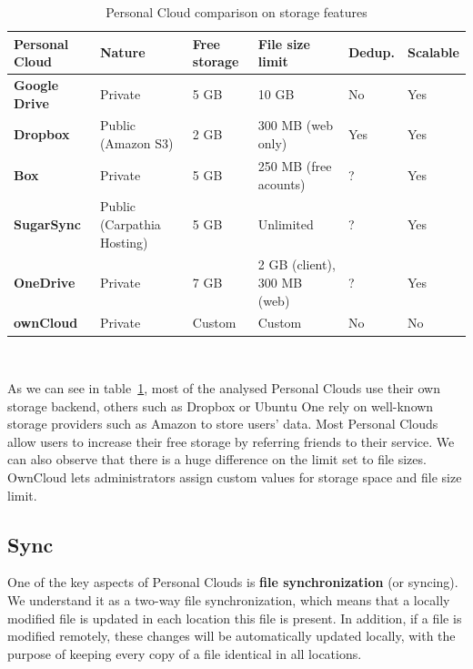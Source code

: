 \begin{table}
\begin{center}
    \begin{tabular}{ | p{3cm} | p{1.8cm} | p{1.5cm} | p{2.6cm} | p{1.3cm} | p{1.5cm} | }
    \hline
    \rowcolor[gray]{0.8}

	\textbf{Personal Cloud} &
	\textbf{Nature} &
	\textbf{Free storage} &
	\textbf{File size limit} & 
	\textbf{Dedup.} & 
	\textbf{Scalable} \\ \hline

	\textbf{Google Drive} &
	Private &
	5 GB &
	10 GB &
	No &
	Yes \\ \hline

	\textbf{Dropbox} &
	Public (Amazon S3) &
	2 GB &
	300 MB (web only) &
	Yes &
	Yes \\ \hline
	
	
	\textbf{Box} &
	Private &
	5 GB & 
	250 MB (free acounts) &
	? &
	Yes \\ \hline
	
	\textbf{SugarSync} & 
	Public (Carpathia Hosting) &
	5 GB &
	Unlimited &
	? &
	Yes \\ \hline
	
	\textbf{OneDrive} & 
	Private &
	7 GB &
	2 GB (client), 300 MB (web) &
	? &
	Yes \\ \hline
	
	\textbf{ownCloud} &
	Private &
	Custom &
	Custom &
	No &
	No \\ \hline

    \end{tabular}
    \\[10pt]
    \caption{Personal Cloud comparison on storage features}
    \label{tab:pc_storage}
\end{center}
\end{table}

As we can see in table~\ref{tab:pc_storage}, most of the analysed Personal Clouds use their own storage backend, others such as Dropbox or Ubuntu One rely on well-known storage providers such as Amazon to store users' data. Most Personal Clouds allow users to increase their free storage by referring friends to their service. We can also observe that there is a huge difference on the limit set to file sizes. OwnCloud lets administrators assign custom values for storage space and file size limit.

\subsection{Sync}
One of the key aspects of Personal Clouds is \textbf{file synchronization} (or syncing). We understand it as a two-way file synchronization, which means that a locally modified file is updated in each location this file is present. In addition, if a file is modified remotely, these changes will be automatically updated locally, with the purpose of keeping every copy of a file identical in all locations.

